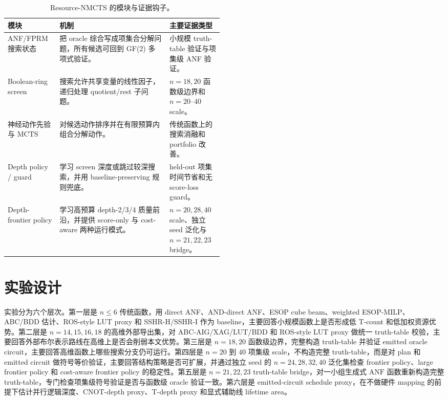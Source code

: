 \documentclass[UTF8,fontset=macnew,11pt]{ctexart}
\newcommand{\method}{Resource-NMCTS}
\newcommand{\anf}{\ensuremath{\mathrm{ANF}}}
\newcommand{\mcts}{\ensuremath{\mathrm{MCTS}}}
\newcommand{\ttable}{truth-table}
\begin{document}
\begin{table}[H]
\centering
\small
\caption{\method{} 的模块与证据钩子。}
\label{tab:modules}
\begin{tabularx}{\linewidth}{>{\raggedright\arraybackslash}p{0.24\linewidth}>{\raggedright\arraybackslash}X>{\raggedright\arraybackslash}p{0.25\linewidth}}
\toprule
模块 & 机制 & 主要证据类型 \\
\midrule
ANF/FPRM 搜索状态 & 把 oracle 综合写成项集合分解问题，所有候选可回到 GF(2) 多项式验证。 & 小规模 truth-table 验证与项集级 ANF 验证。 \\
Boolean-ring screen & 搜索允许共享变量的线性因子，递归处理 quotient/rest 子问题。 & $n=18,20$ 函数级边界和 $n=20$--$40$ scale。 \\
神经动作先验与 \mcts{} & 对候选动作排序并在有限预算内组合分解动作。 & 传统函数上的搜索消融和 portfolio 改善。 \\
Depth policy / guard & 学习 screen 深度或跳过较深搜索，并用 baseline-preserving 规则兜底。 & held-out 项集时间节省和无 score-loss guard。 \\
Depth-frontier policy & 学习高预算 depth-2/3/4 质量前沿，并提供 score-only 与 cost-aware 两种运行模式。 & $n=20,28,40$ scale、独立 seed 泛化与 $n=21,22,23$ bridge。 \\
\bottomrule
\end{tabularx}
\end{table}

\section{实验设计}

实验分为六个层次。第一层是 $n\leq6$ 传统函数，用 direct ANF、AND-direct ANF、ESOP cube beam、weighted ESOP-MILP、ABC/BDD 估计、ROS-style LUT proxy 和 SSHR-H/SSHR-I 作为 baseline，主要回答小规模函数上是否形成低 T-count 和低加权资源优势。第二层是 $n=14,15,16,18$ 的高维外部导出集，对 ABC-AIG/XAG/LUT/BDD 和 ROS-style LUT proxy 做统一 truth-table 校验，主要回答外部布尔表示路线在高维上是否会削弱本文优势。第三层是 $n=18,20$ 函数级边界，完整构造 \ttable{} 并验证 emitted oracle circuit，主要回答高维函数上哪些搜索分支仍可运行。第四层是 $n=20$ 到 $40$ 项集级 scale，不构造完整 \ttable{}，而是对 plan 和 emitted circuit 做符号等价验证，主要回答结构策略是否可扩展，并通过独立 seed 的 $n=24,28,32,40$ 泛化集检查 frontier policy、large frontier policy 和 cost-aware frontier policy 的稳定性。第五层是 $n=21,22,23$ truth-table bridge，对一小组生成式 \anf{} 函数重新构造完整 \ttable{}，专门检查项集级符号验证是否与函数级 oracle 验证一致。第六层是 emitted-circuit schedule proxy，在不做硬件 mapping 的前提下估计并行逻辑深度、CNOT-depth proxy、T-depth proxy 和显式辅助线 lifetime area。
\end{document}
